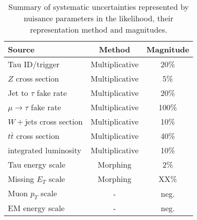 \begin{table}
  \begin{center}
    \begin{tabular}{|l|c|c|} \hline
  Source                 &       Method      &   Magnitude  \\ \hline
Tau ID/trigger           &  Multiplicative   &    20\%      \\
$Z$ cross section        &  Multiplicative   &     5\%      \\
Jet to $\tau$ fake rate  &  Multiplicative   &    20\%      \\
$\mu\to\tau$ fake rate   &  Multiplicative   &   100\%      \\
$W+$jets cross section   &  Multiplicative   &    10\%      \\
$t\bar{t}$ cross section &  Multiplicative   &    40\%      \\
integrated luminosity    &  Multiplicative   &    10\%      \\
Tau energy scale         &  Morphing         &     2\%      \\
Missing $E_T$ scale      &  Morphing         &     XX\%      \\
Muon $p_T$ scale         &   -               &   neg.       \\
EM energy scale          &   -               &   neg.       \\ \hline
    \end{tabular}
   \end{center}
  \caption{Summary of systematic uncertainties represented by nuisance 
           parameters in the likelihood, their representation method 
           and magnitudes.\label{tab-sys}}
\end{table}


\ifx\master\undefined\fi
